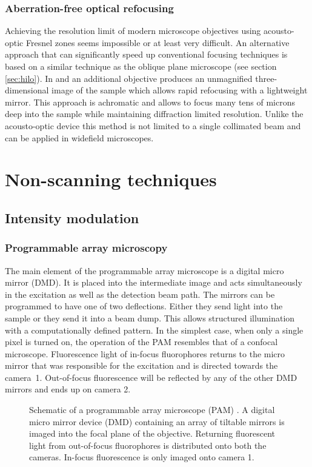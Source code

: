\subsubsection{Aberration-free optical refocusing}
Achieving the resolution limit of modern microscope objectives using
acousto-optic Fresnel zones seems impossible or at least very
difficult. An alternative approach that can significantly speed up
conventional focusing techniques is based on a similar technique as
the oblique plane microscope (see section \ref{sec:hilo}). In
\cite{Botcherby2007} and \cite{botcherby2012aberration} an additional
objective produces an unmagnified three-dimensional image of the
sample which allows rapid refocusing with a lightweight mirror. This
approach is achromatic and allows to focus many tens of microns deep
into the sample while maintaining diffraction limited
resolution. Unlike the acousto-optic device this method is not limited
to a single collimated beam and can be applied in widefield
microscopes.

\section{Non-scanning techniques}
\subsection{Intensity modulation}
\subsubsection{Programmable array microscopy}
\label{ref:pam}
The main element of the programmable array microscope is a digital
micro mirror (DMD). It is placed into the intermediate image and acts
simultaneously in the excitation as well as the detection beam
path. The mirrors can be programmed to have one of two
deflections. Either they send light into the sample or they send it
into a beam dump. This allows structured illumination with a
computationally defined pattern. In the simplest case, when only a
single pixel is turned on, the operation of the PAM resembles that of
a confocal microscope. Fluorescence light of in-focus fluorophores
returns to the micro mirror that was responsible for the excitation and
is directed towards the camera~1. Out-of-focus fluorescence will be
reflected by any of the other DMD mirrors and ends up on camera 2.

\begin{figure}[htbp]
  \centering
  \caption{Schematic of a programmable array microscope (PAM)
    \citep[inspired from][]{Verveer1998}. A digital micro mirror
    device (DMD) containing an array of tiltable mirrors is imaged
    into the focal plane of the objective. Returning fluorescent light
    from out-of-focus fluorophores is distributed onto both the
    cameras. In-focus fluorescence is only imaged onto camera 1.}
  \label{fig:pam-sketch}
\end{figure}


